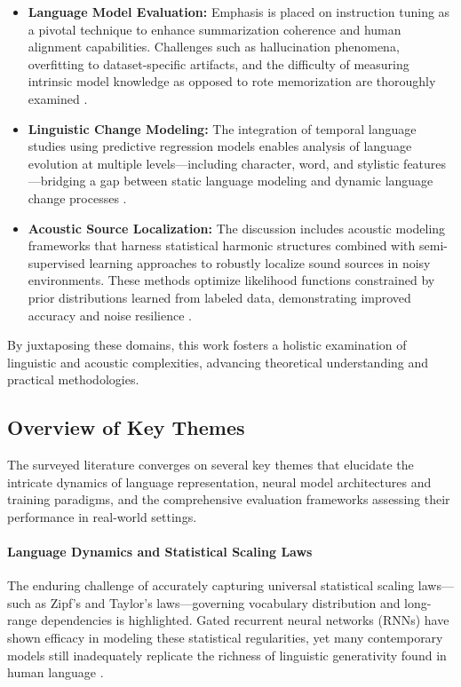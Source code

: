 \documentclass[11pt]{article}
\begin{document}
\begin{itemize}
    \item \textbf{Language Model Evaluation:} Emphasis is placed on instruction tuning as a pivotal technique to enhance summarization coherence and human alignment capabilities. Challenges such as hallucination phenomena, overfitting to dataset-specific artifacts, and the difficulty of measuring intrinsic model knowledge as opposed to rote memorization are thoroughly examined \cite{ref10, ref51, ref52}.
    \item \textbf{Linguistic Change Modeling:} The integration of temporal language studies using predictive regression models enables analysis of language evolution at multiple levels—including character, word, and stylistic features—bridging a gap between static language modeling and dynamic language change processes \cite{ref41}.
    \item \textbf{Acoustic Source Localization:} The discussion includes acoustic modeling frameworks that harness statistical harmonic structures combined with semi-supervised learning approaches to robustly localize sound sources in noisy environments. These methods optimize likelihood functions constrained by prior distributions learned from labeled data, demonstrating improved accuracy and noise resilience \cite{ref1, ref2, ref3, ref26, ref51}.
\end{itemize}

By juxtaposing these domains, this work fosters a holistic examination of linguistic and acoustic complexities, advancing theoretical understanding and practical methodologies.

\subsection{Overview of Key Themes}

The surveyed literature converges on several key themes that elucidate the intricate dynamics of language representation, neural model architectures and training paradigms, and the comprehensive evaluation frameworks assessing their performance in real-world settings.

\paragraph{Language Dynamics and Statistical Scaling Laws}  
The enduring challenge of accurately capturing universal statistical scaling laws—such as Zipf’s and Taylor’s laws—governing vocabulary distribution and long-range dependencies is highlighted. Gated recurrent neural networks (RNNs) have shown efficacy in modeling these statistical regularities, yet many contemporary models still inadequately replicate the richness of linguistic generativity found in human language \cite{ref51}.
\end{document}
